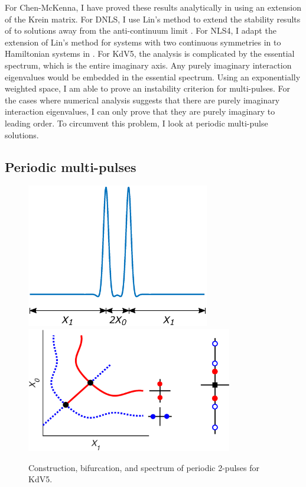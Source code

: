 \documentclass[12pt,reqno,oneside]{article}
\theoremstyle{definition}
\theoremstyle{remark}
\begin{document}
For Chen-McKenna, I have proved these results analytically in \cite{Kapitula2020} using an extension of the Krein matrix. For DNLS, I use Lin's method to extend the stability results of \cite{Kapitula2001,Kapitula2001a} to solutions away from the anti-continuum limit \cite{Parker2020}. For NLS4, I adapt the extension of Lin's method for systems with two continuous symmetries in \cite{Manukian} to Hamiltonian systems in \cite{Parker2020NLS4}. For KdV5, the analysis is complicated by the essential spectrum, which is the entire imaginary axis. Any purely imaginary interaction eigenvalues would be embedded in the essential spectrum. Using an exponentially weighted space, I am able to prove an instability criterion for multi-pulses. For the cases where numerical analysis suggests that there are purely imaginary interaction eigenvalues, I can only prove that they are purely imaginary to leading order. To circumvent this problem, I look at periodic multi-pulse solutions.

\subsection{Periodic multi-pulses}

\begin{figure}[H]
\begin{center}
\includegraphics[width=8cm]{images/DPperiodic.eps} \hspace{-1cm}
\includegraphics[width=9cm]{images/2pitchforkcoloreig2.eps}
\end{center}
\caption{Construction, bifurcation, and spectrum of periodic 2-pulses for KdV5.}
\label{fig:periodic}
\end{figure}
\end{document}
